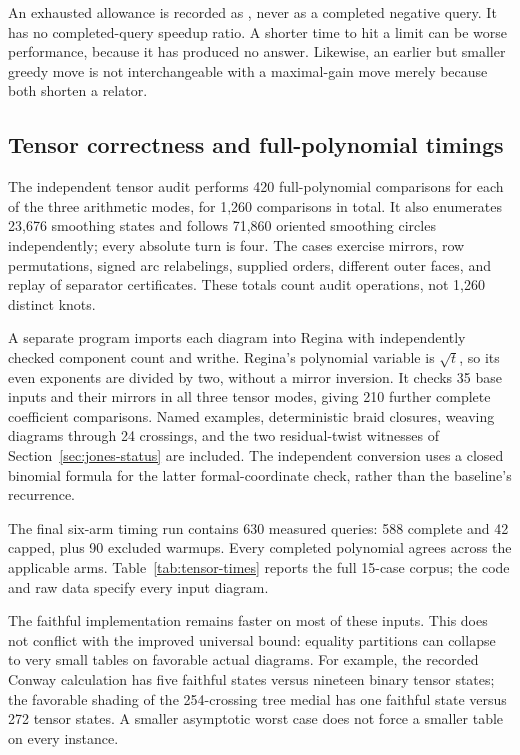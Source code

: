 An exhausted allowance is recorded as , never as a completed
negative query. It has no completed-query speedup ratio. A shorter time to
hit a limit can be worse performance, because it has produced no answer.
Likewise, an earlier but smaller greedy move is not interchangeable with a
maximal-gain move merely because both shorten a relator.

\subsection{Tensor correctness and full-polynomial timings}

The independent tensor audit performs 420 full-polynomial comparisons for
each of the three arithmetic modes, for 1,260 comparisons in total. It also
enumerates 23,676 smoothing states and follows 71,860 oriented smoothing
circles independently; every absolute turn is four. The cases exercise
mirrors, row permutations, signed arc relabelings, supplied orders, different
outer faces, and replay of separator certificates. These totals count audit
operations, not 1,260 distinct knots.

A separate program imports each diagram into Regina with independently
checked component count and writhe. Regina's polynomial variable is
$\sqrt t$, so its even exponents are divided by two, without a mirror
inversion. It checks 35 base inputs and their mirrors in all three tensor
modes, giving 210 further complete coefficient comparisons. Named examples,
deterministic braid closures, weaving diagrams through 24 crossings, and the
two residual-twist witnesses of Section~\ref{sec:jones-status} are included.
The independent conversion uses a closed binomial formula for the latter
formal-coordinate check, rather than the baseline's recurrence.

The final six-arm timing run contains 630 measured queries: 588 complete
and 42 capped, plus 90 excluded warmups. Every completed polynomial agrees
across the applicable arms. Table~\ref{tab:tensor-times} reports the full
15-case corpus; the code and raw data specify every input diagram.



The faithful implementation remains faster on most of these inputs. This
does not conflict with the improved universal bound: equality partitions
can collapse to very small tables on favorable actual diagrams. For example,
the recorded Conway calculation has five faithful states versus nineteen
binary tensor states; the favorable shading of the 254-crossing tree medial
has one faithful state versus 272 tensor states. A smaller asymptotic worst
case does not force a smaller table on every instance.

